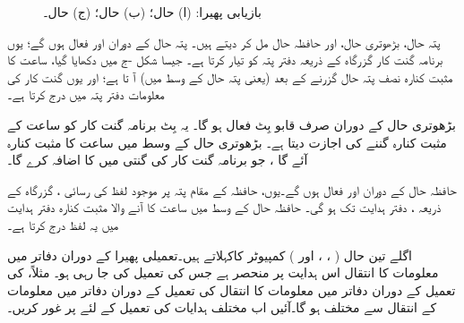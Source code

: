 \begin{figure}
\begin{subfigure}{0.30\textwidth}
\caption{}
\end{subfigure}
\caption{
بازیابی پھیرا: (ا)  حال؛ (ب)  حال؛ (ج)  حال۔
}
\label{شکل_کمپیوٹر_اجاگر_حصے_بازیابی_پھیرا}
\end{figure}


پتہ حال، بڑھوتری حال، اور حافظہ حال مل کر  دیتے ہیں۔ پتہ حال کے دوران  اور  فعال ہوں گے؛ یوں برنامہ گنت کار    گزرگاہ کے ذریعہ  دفتر پتہ کو  تیار کرتا ہے۔ جیسا شکل  -ج   میں دکھایا گیا،  ساعت کا مثبت کنارہ  نصف  پتہ حال  گزرنے کے بعد (یعنی  پتہ حال کے وسط میں)  آ تا ہے؛ اور یوں  گنت کار کی معلومات دفتر پتہ میں  درج کرتا ہے۔

بڑھوتری حال کے دوران صرف  قابو بِٹ فعال ہو گا۔ یہ بِٹ برنامہ گنت کار  کو ساعت کے مثبت کنارہ گننے کی اجازت دیتا ہے۔ بڑھوتری حال کے وسط میں ساعت کا مثبت کنارہ آئے گا ، جو برنامہ گنت کار کی گنتی میں    کا اضافہ کرے گا۔

حافظہ حال کے دوران  اور  فعال ہوں گے۔یوں،  حافظہ کے مقام پتہ پر موجود  لفظ کی رسائی ،  گزرگاہ کے ذریعہ ، دفتر ہدایت تک    ہو گی۔ حافظہ حال کے وسط میں   ساعت کا  آنے والا مثبت کنارہ  دفتر ہدایت میں یہ لفظ  درج کرتا ہے۔

اگلے تین حال ( ، ، اور  ) کمپیوٹر کاکہلاتے   ہیں۔تعمیلی پھیرا  کے دوران دفاتر میں معلومات کا انتقال  اس ہدایت پر منحصر ہے جس کی تعمیل کی جا رہی ہو۔ مثلاً،    کی تعمیل کے دوران دفاتر میں معلومات کا انتقال   کی تعمیل کے دوران دفاتر میں معلومات کے انتقال  سے مختلف ہو گا۔آئیں     اب مختلف ہدایات  کی تعمیل  کے لئے پر غور کریں۔

